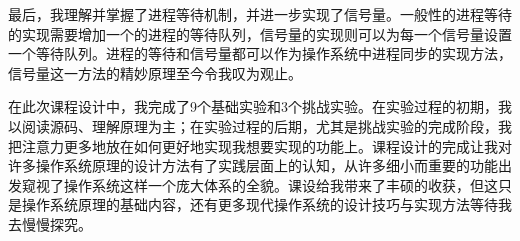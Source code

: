 最后，我理解并掌握了进程等待机制，并进一步实现了信号量。一般性的进程等待的实现需要增加一个的进程的等待队列，信号量的实现则可以为每一个信号量设置一个等待队列。进程的等待和信号量都可以作为操作系统中进程同步的实现方法，信号量这一方法的精妙原理至今令我叹为观止。

在此次课程设计中，我完成了9个基础实验和3个挑战实验。在实验过程的初期，我以阅读源码、理解原理为主；在实验过程的后期，尤其是挑战实验的完成阶段，我把注意力更多地放在如何更好地实现我想要实现的功能上。课程设计的完成让我对许多操作系统原理的设计方法有了实践层面上的认知，从许多细小而重要的功能出发窥视了操作系统这样一个庞大体系的全貌。课设给我带来了丰硕的收获，但这只是操作系统原理的基础内容，还有更多现代操作系统的设计技巧与实现方法等待我去慢慢探究。
